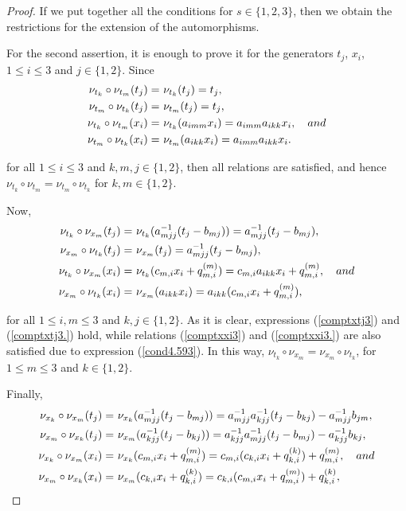 \documentclass[10pt,a4paper]{amsart}
\begin{document}
\begin{proof}
If we put together all the conditions for $s \in \{1, 2, 3\}$, then we obtain the restrictions for the extension of the automorphisms.

For the second assertion, it is enough to prove it for the generators $t_j$, $x_i$, $1\leq i \leq 3$ and $j \in \{1, 2\}$. Since
\begin{align}
    \nu_{t_k} \circ \nu_{t_m}(t_j) = &\ \nu_{t_k}(t_j)=t_j, \label{comptttj3}\\
    \nu_{t_m} \circ \nu_{t_k}(t_j) = &\ \nu_{t_m}(t_j)=t_j, \label{comptttj3.} \\
    \nu_{t_k} \circ \nu_{t_m}(x_i) = &\ \nu_{t_k}(a_{imm}x_i)=a_{imm}a_{ikk}x_i, \quad {\rm and}  \label{compttxi3}\\
    \nu_{t_m} \circ \nu_{t_k}(x_i) = &\ \nu_{t_m}(a_{ikk}x_i)=a_{imm}a_{ikk}x_i. \label{compttxi3.}
\end{align}

for all $1\leq i \leq 3$ and $k,m,j \in \{1, 2\}$, then all relations are satisfied, and hence $\nu_{t_k} \circ \nu_{t_m} = \nu_{t_m} \circ \nu_{t_k}$ for $k,m \in \{1, 2\}$.

Now, 
\begin{align}
    \nu_{t_k} \circ \nu_{x_m}(t_j) = &\ \nu_{t_k}(a_{mjj}^{-1}(t_j-b_{mj}))=a_{mjj}^{-1}(t_j-b_{mj}), \label{comptxtj3}\\
    \nu_{x_m} \circ \nu_{t_k}(t_j) = &\ \nu_{x_m}(t_j)=a_{mjj}^{-1}(t_j-b_{mj}), \label{comptxtj3.} \\
    \nu_{t_k} \circ \nu_{x_m}(x_i) = &\ \nu_{t_k}(c_{m,i}x_i+q_{m,i}^{(m)})=c_{m,i}a_{ikk}x_i+q_{m,i}^{(m)}, \label{comptxxi3} \quad {\rm and} \\
    \nu_{x_m} \circ \nu_{t_k}(x_i) = &\ \nu_{x_m}(a_{ikk}x_i)=a_{ikk}(c_{m,i}x_i+q_{m,i}^{(m)}), \label{comptxxi3.}
\end{align}

for all $1\leq i,m \leq 3$ and $k,j \in \{1, 2\}$. As it is clear, expressions {\rm (}\ref{comptxtj3}{\rm )} and {\rm (}\ref{comptxtj3.}{\rm )} hold, while relations {\rm (}\ref{comptxxi3}{\rm )} and {\rm (}\ref{comptxxi3.}{\rm )} are also satisfied due to expression {\rm (}\ref{cond4.593}{\rm )}. In this way, $\nu_{t_k} \circ \nu_{x_m} = \nu_{x_m} \circ \nu_{t_k}$, for  $1\leq m \leq 3$ and $k \in \{1, 2\}$.

Finally, 
\begin{align}
    \nu_{x_k} \circ \nu_{x_m}(t_j) = &\ \nu_{x_k}(a_{mjj}^{-1}(t_j-b_{mj}))=a_{mjj}^{-1}a_{kjj}^{-1}(t_j-b_{kj})-a_{mjj}^{-1}b_{jm}, \label{compxxtj3}\\
    \nu_{x_m} \circ \nu_{x_k}(t_j) = &\ \nu_{x_m}(a_{kjj}^{-1}(t_j-b_{kj}))=a_{kjj}^{-1}a_{mjj}^{-1}(t_j-b_{mj})-a_{kjj}^{-1}b_{kj}, \label{compxxtj3.} \\
    \nu_{x_k} \circ \nu_{x_m}(x_i) = &\ \nu_{x_k}(c_{m,i}x_i+q_{m,i}^{(m)})=c_{m,i}(c_{k,i}x_i+q_{k,i}^{(k)})+q_{m,i}^{(m)}, \quad {\rm and} \label{compxxxi3}\\
    \nu_{x_m} \circ \nu_{x_k}(x_i) = &\ \nu_{x_m}(c_{k,i}x_i+q_{k,i}^{(k)})=c_{k,i}(c_{m,i}x_i+q_{m,i}^{(m)})+q_{k,i}^{(k)}, \label{compxxxi3.}
\end{align}


\end{proof}
\end{document}
